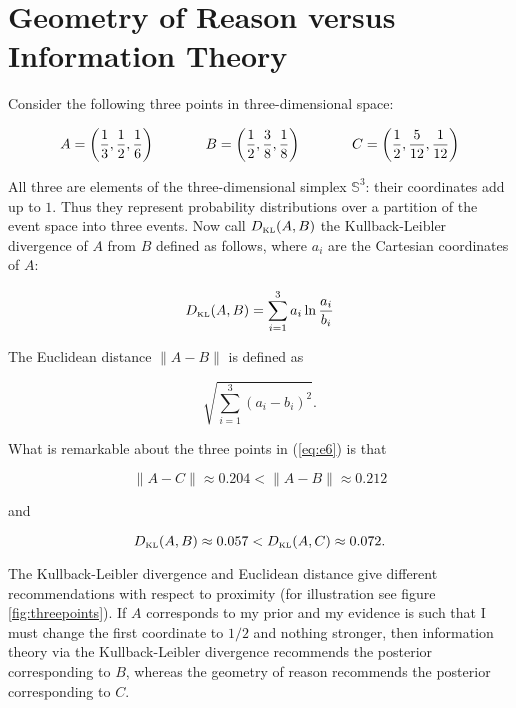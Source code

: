 \documentclass[11pt]{article}
\begin{document}
\section{Geometry of Reason versus Information Theory}
\label{grit}

Consider the following three points in three-dimensional space: 

\begin{equation}
  \label{eq:e6}
    A=\left(\frac{1}{3},\frac{1}{2},\frac{1}{6}\right) \hspace{.5in}
    B=\left(\frac{1}{2},\frac{3}{8},\frac{1}{8}\right)  \hspace{.5in}
    C=\left(\frac{1}{2},\frac{5}{12},\frac{1}{12}\right)
\end{equation}

All three are elements of the three-dimensional simplex
$\mathbb{S}^{3}$: their coordinates add up to $1$. Thus they represent
probability distributions over a partition of the event space into
three events. Now call $D_{\mbox{\tiny KL}}(A,B)$ the Kullback-Leibler
divergence of $A$ from $B$ defined as follows, where $a_{i}$ are the
Cartesian coordinates of $A$:

\begin{equation}
  \label{eq:e7}
  D_{\mbox{\tiny KL}}(A,B)=\sum_{i=1}^{3}a_{i}\ln\frac{a_{i}}{b_{i}}
\end{equation}

The Euclidean distance $\|A-B\|$ is defined as 

\begin{equation}
  \label{eq:e3}
  \sqrt{\sum_{i=1}^{3}\left(a_{i}-b_{i}\right)^{2}}.
\end{equation}

What is remarkable about the three points in (\ref{eq:e6}) is that

\begin{equation}
  \label{eq:e8}
  \|A-C\|\approx{}0.204<\|A-B\|\approx{}0.212
\end{equation}

and

\begin{equation}
  \label{eq:e9}
  D_{\mbox{\tiny KL}}(A,B)\approx{}0.057<D_{\mbox{\tiny KL}}(A,C)\approx{}0.072.
\end{equation}

The Kullback-Leibler divergence and Euclidean distance give different
recommendations with respect to proximity (for illustration see figure
\ref{fig:threepoints}). If $A$ corresponds to my prior and my evidence
is such that I must change the first coordinate to $1/2$ and nothing
stronger, then information theory via the Kullback-Leibler divergence
recommends the posterior corresponding to $B$, whereas the geometry of
reason recommends the posterior corresponding to $C$.
\end{document}
